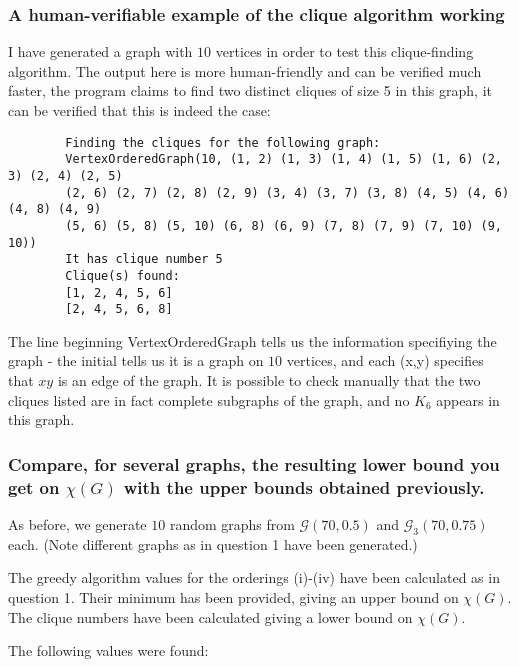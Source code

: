 \documentclass{article}
\newcommand{\programquote}[1]{\fontfamily{pcr}\selectfont 
				#1\normalfont
			}
\begin{document}
\subsubsection{A human-verifiable example of the clique algorithm working}

I have generated a graph with $10$ vertices in order to test this clique-finding algorithm. The output here is more human-friendly and can be verified much faster, the program claims to find two distinct cliques of size 5 in this graph, it can be verified that this is indeed the case:

\begin{tcolorbox}[size=small]
	\begin{verbatim}
		Finding the cliques for the following graph:
		VertexOrderedGraph(10, (1, 2) (1, 3) (1, 4) (1, 5) (1, 6) (2, 3) (2, 4) (2, 5)
		(2, 6) (2, 7) (2, 8) (2, 9) (3, 4) (3, 7) (3, 8) (4, 5) (4, 6) (4, 8) (4, 9)
		(5, 6) (5, 8) (5, 10) (6, 8) (6, 9) (7, 8) (7, 9) (7, 10) (9, 10))
		It has clique number 5
		Clique(s) found:
		[1, 2, 4, 5, 6]
		[2, 4, 5, 6, 8]
	\end{verbatim}
\end{tcolorbox}

The line beginning \programquote{VertexOrderedGraph} tells us the information specifiying the graph - the initial \programquote{10} tells us it is a graph on $10$ vertices, and each \programquote{(x,y)} specifies that $xy$ is an edge of the graph. It is possible to check manually that the two cliques listed are in fact complete subgraphs of the graph, and no $K_6$ appears in this graph.

\subsubsection{Compare, for several graphs, the resulting lower bound you get on $\chi(G)$ with the upper bounds obtained previously.}

As before, we generate $10$ random graphs from $\mathcal{G}(70, 0.5)$ and $\mathcal{G}_3(70, 0.75)$ each. (Note different graphs as in question 1 have been generated.)

The greedy algorithm values for the orderings (i)-(iv) have been calculated as in question 1. Their minimum has been provided, giving an upper bound on $\chi(G)$. The clique numbers have been calculated giving a lower bound on $\chi(G)$.

The following values were found:

\begin{center}
\end{center}
\end{document}
